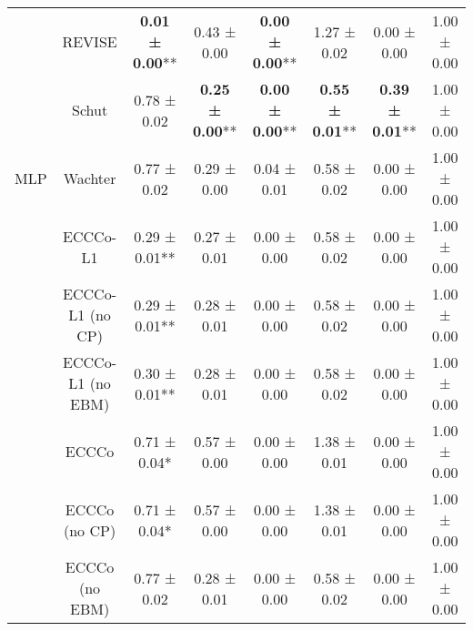 \begin{table}
{\begin{tabular}[t]{cccccccc}
 & REVISE & \textbf{0.01 ± 0.00}** & 0.43 ± 0.00\hphantom{*}\hphantom{*} & \textbf{0.00 ± 0.00}** & 1.27 ± 0.02\hphantom{*}\hphantom{*} & 0.00 ± 0.00\hphantom{*}\hphantom{*} & 1.00 ± 0.00\hphantom{*}\hphantom{*}\\

 & Schut & 0.78 ± 0.02\hphantom{*}\hphantom{*} & \textbf{0.25 ± 0.00}** & \textbf{0.00 ± 0.00}** & \textbf{0.55 ± 0.01}** & \textbf{0.39 ± 0.01}** & 1.00 ± 0.00\hphantom{*}\hphantom{*}\\

\multirow[t]{-9}{*}{\centering\arraybackslash MLP} & Wachter & 0.77 ± 0.02\hphantom{*}\hphantom{*} & 0.29 ± 0.00\hphantom{*}\hphantom{*} & 0.04 ± 0.01\hphantom{*}\hphantom{*} & 0.58 ± 0.02\hphantom{*}\hphantom{*} & 0.00 ± 0.00\hphantom{*}\hphantom{*} & 1.00 ± 0.00\hphantom{*}\hphantom{*}\\
\cmidrule{1-8}
 & ECCCo-L1 & 0.29 ± 0.01** & 0.27 ± 0.01\hphantom{*}\hphantom{*} & 0.00 ± 0.00\hphantom{*}\hphantom{*} & 0.58 ± 0.02\hphantom{*}\hphantom{*} & 0.00 ± 0.00\hphantom{*}\hphantom{*} & 1.00 ± 0.00\hphantom{*}\hphantom{*}\\

 & ECCCo-L1 (no CP) & 0.29 ± 0.01** & 0.28 ± 0.01\hphantom{*}\hphantom{*} & 0.00 ± 0.00\hphantom{*}\hphantom{*} & 0.58 ± 0.02\hphantom{*}\hphantom{*} & 0.00 ± 0.00\hphantom{*}\hphantom{*} & 1.00 ± 0.00\hphantom{*}\hphantom{*}\\

 & ECCCo-L1 (no EBM) & 0.30 ± 0.01** & 0.28 ± 0.01\hphantom{*}\hphantom{*} & 0.00 ± 0.00\hphantom{*}\hphantom{*} & 0.58 ± 0.02\hphantom{*}\hphantom{*} & 0.00 ± 0.00\hphantom{*}\hphantom{*} & 1.00 ± 0.00\hphantom{*}\hphantom{*}\\

 & ECCCo & 0.71 ± 0.04*\hphantom{*} & 0.57 ± 0.00\hphantom{*}\hphantom{*} & 0.00 ± 0.00\hphantom{*}\hphantom{*} & 1.38 ± 0.01\hphantom{*}\hphantom{*} & 0.00 ± 0.00\hphantom{*}\hphantom{*} & 1.00 ± 0.00\hphantom{*}\hphantom{*}\\

 & ECCCo (no CP) & 0.71 ± 0.04*\hphantom{*} & 0.57 ± 0.00\hphantom{*}\hphantom{*} & 0.00 ± 0.00\hphantom{*}\hphantom{*} & 1.38 ± 0.01\hphantom{*}\hphantom{*} & 0.00 ± 0.00\hphantom{*}\hphantom{*} & 1.00 ± 0.00\hphantom{*}\hphantom{*}\\

 & ECCCo (no EBM) & 0.77 ± 0.02\hphantom{*}\hphantom{*} & 0.28 ± 0.01\hphantom{*}\hphantom{*} & 0.00 ± 0.00\hphantom{*}\hphantom{*} & 0.58 ± 0.02\hphantom{*}\hphantom{*} & 0.00 ± 0.00\hphantom{*}\hphantom{*} & 1.00 ± 0.00\hphantom{*}\hphantom{*}\\


\end{tabular}}
\end{table}
